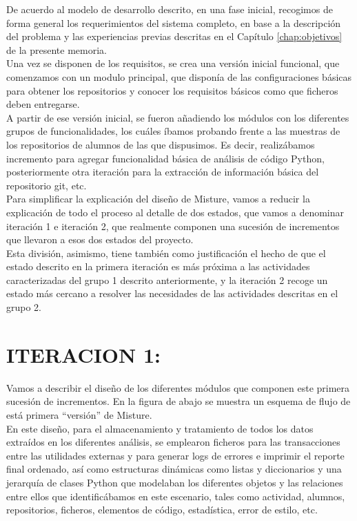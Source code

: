 De acuerdo al modelo de desarrollo descrito, en una fase inicial, recogimos de forma general los requerimientos del sistema completo, en base a la descripción del problema y las experiencias previas descritas en el Capítulo \ref{chap:objetivos} de la presente memoria.\\


Una vez se disponen de los requisitos, se crea una versión inicial funcional, que comenzamos con un modulo principal, que disponía de las configuraciones básicas para obtener los repositorios y conocer los requisitos básicos como que ficheros deben entregarse.\\


A partir de ese versión inicial, se fueron añadiendo los módulos con los diferentes grupos de funcionalidades, los cuáles íbamos probando frente a las muestras de los repositorios de alumnos de las que dispusimos. Es decir, realizábamos incremento para agregar funcionalidad básica de análisis de código Python, posteriormente otra iteración para la extracción de información básica del repositorio git, etc.\\


Para simplificar la explicación del diseño de Misture, vamos a reducir la explicación de todo el proceso al detalle de dos estados, que vamos a denominar iteración 1 e iteración 2, que realmente componen una sucesión de incrementos que llevaron a esos dos estados del proyecto.\\


Esta división, asimismo, tiene también como justificación el hecho de que el estado descrito en la primera iteración es más próxima a las actividades caracterizadas del grupo 1 descrito anteriormente, y la iteración 2 recoge un estado más cercano a resolver las necesidades de las actividades descritas en el grupo 2.\\

\section{ITERACION 1:}

Vamos a describir el diseño de los diferentes módulos que componen este primera sucesión de incrementos. En la figura de abajo se muestra un esquema de flujo de está primera ``versión'' de Misture.\\


En este diseño, para el almacenamiento y tratamiento de todos los datos extraídos en los diferentes análisis, se emplearon ficheros para las transacciones entre las utilidades externas y para generar logs de errores e imprimir el reporte final ordenado, así como estructuras dinámicas como listas y diccionarios y una jerarquía de clases Python que modelaban los diferentes objetos y las relaciones entre ellos que identificábamos en este escenario, tales como actividad, alumnos, repositorios, ficheros, elementos de código, estadística, error de estilo, etc.\\


